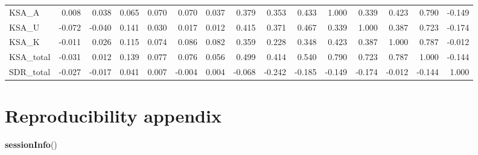 \documentclass[
  10pt,
]{article}
\newenvironment{Shaded}{\begin{snugshade}}{\end{snugshade}}
\newcommand{\FunctionTok}[1]{\textcolor[rgb]{0.13,0.29,0.53}{\textbf{#1}}}
\newcommand{\NormalTok}[1]{#1}
\begin{document}
\begin{longtable}[t]{lrrrrrrrrrrrrrr}
KSA\_A & 0.008 & 0.038 & 0.065 & 0.070 & 0.070 & 0.037 & 0.379 & 0.353 & 0.433 & 1.000 & 0.339 & 0.423 & 0.790 & -0.149\\
\addlinespace
KSA\_U & -0.072 & -0.040 & 0.141 & 0.030 & 0.017 & 0.012 & 0.415 & 0.371 & 0.467 & 0.339 & 1.000 & 0.387 & 0.723 & -0.174\\
KSA\_K & -0.011 & 0.026 & 0.115 & 0.074 & 0.086 & 0.082 & 0.359 & 0.228 & 0.348 & 0.423 & 0.387 & 1.000 & 0.787 & -0.012\\
KSA\_total & -0.031 & 0.012 & 0.139 & 0.077 & 0.076 & 0.056 & 0.499 & 0.414 & 0.540 & 0.790 & 0.723 & 0.787 & 1.000 & -0.144\\
SDR\_total & -0.027 & -0.017 & 0.041 & 0.007 & -0.004 & 0.004 & -0.068 & -0.242 & -0.185 & -0.149 & -0.174 & -0.012 & -0.144 & 1.000\\
\bottomrule
\end{longtable}

\hypertarget{reproducibility-appendix}{%
\section{Reproducibility appendix}\label{reproducibility-appendix}}

\begin{Shaded}
\begin{Highlighting}[]
\FunctionTok{sessionInfo}\NormalTok{()}
\end{Highlighting}
\end{Shaded}
\end{document}
